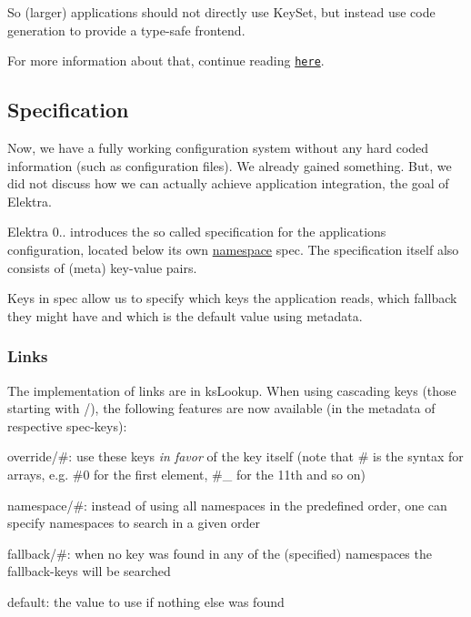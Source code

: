 So (larger) applications should not directly use {\ttfamily Key\+Set}, but instead use code generation to provide a type-\/safe frontend.

For more information about that, continue reading \href{https://master.libelektra.org/src/tools/pythongen}{\tt here}.

\subsection*{Specification}

Now, we have a fully working configuration system without any hard coded information (such as configuration files). We already gained something. But, we did not discuss how we can actually achieve application integration, the goal of Elektra.

Elektra 0.. introduces the so called specification for the application\textquotesingle{}s configuration, located below its own \hyperlink{doc_help_elektra-namespaces_md}{namespace} {\ttfamily spec}. The specification itself also consists of (meta) key-\/value pairs.

Keys in {\ttfamily spec} allow us to specify which keys the application reads, which fallback they might have and which is the default value using metadata.

\subsubsection*{Links}

The implementation of links are in {\ttfamily ks\+Lookup}. When using cascading keys (those starting with {\ttfamily /}), the following features are now available (in the metadata of respective {\ttfamily spec}-\/keys)\+:


\begin{DoxyItemize}
\item {\ttfamily override/\#}\+: use these keys {\itshape in favor} of the key itself (note that {\ttfamily \#} is the syntax for arrays, e.\+g. {\ttfamily \#0} for the first element, {\ttfamily \#\+\_} for the 11th and so on)
\item {\ttfamily namespace/\#}\+: instead of using all namespaces in the predefined order, one can specify namespaces to search in a given order
\item {\ttfamily fallback/\#}\+: when no key was found in any of the (specified) namespaces the {\ttfamily fallback}-\/keys will be searched
\item {\ttfamily default}\+: the value to use if nothing else was found
\end{DoxyItemize}

